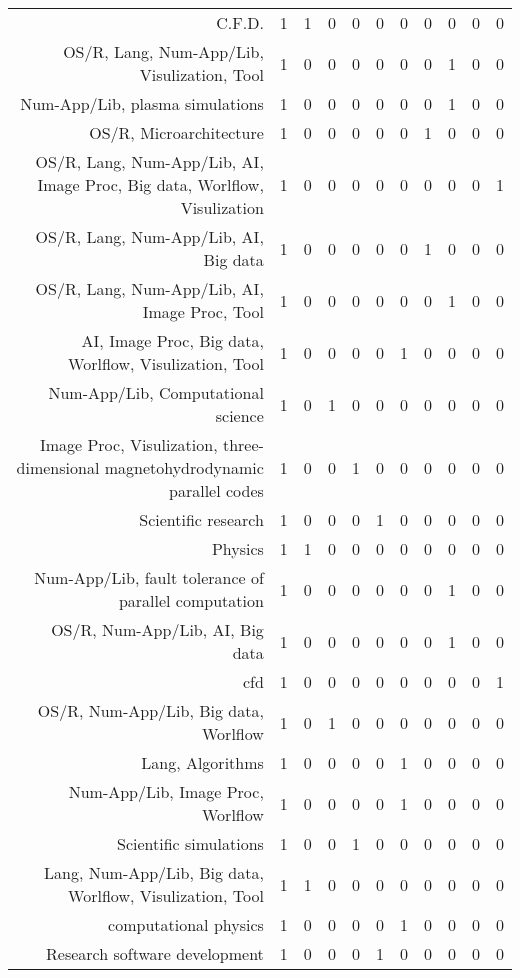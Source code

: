 {\begin{landscape}
\begin{longtable}[htb]{r|c|c|c|c|c|c|c|c|c|c}
{C.F.D.} & 1 & 1 & 0 & 0 & 0 & 0 & 0 & 0 & 0 & 0 \\%
{OS/R, Lang, Num-App/Lib, Visulization, Tool} & 1 & 0 & 0 & 0 & 0 & 0 & 0 & 1 & 0 & 0 \\%
{Num-App/Lib, plasma simulations} & 1 & 0 & 0 & 0 & 0 & 0 & 0 & 1 & 0 & 0 \\%
{OS/R, Microarchitecture} & 1 & 0 & 0 & 0 & 0 & 0 & 1 & 0 & 0 & 0 \\%
{OS/R, Lang, Num-App/Lib, AI, Image Proc, Big data, Worlflow, Visulization} & 1 & 0 & 0 & 0 & 0 & 0 & 0 & 0 & 0 & 1 \\%
{OS/R, Lang, Num-App/Lib, AI, Big data} & 1 & 0 & 0 & 0 & 0 & 0 & 1 & 0 & 0 & 0 \\%
{OS/R, Lang, Num-App/Lib, AI, Image Proc, Tool} & 1 & 0 & 0 & 0 & 0 & 0 & 0 & 1 & 0 & 0 \\%
{AI, Image Proc, Big data, Worlflow, Visulization, Tool} & 1 & 0 & 0 & 0 & 0 & 1 & 0 & 0 & 0 & 0 \\%
{Num-App/Lib, Computational science} & 1 & 0 & 1 & 0 & 0 & 0 & 0 & 0 & 0 & 0 \\%
{Image Proc, Visulization, three-dimensional magnetohydrodynamic parallel codes} & 1 & 0 & 0 & 1 & 0 & 0 & 0 & 0 & 0 & 0 \\%
{Scientific research} & 1 & 0 & 0 & 0 & 1 & 0 & 0 & 0 & 0 & 0 \\%
{Physics} & 1 & 1 & 0 & 0 & 0 & 0 & 0 & 0 & 0 & 0 \\%
{Num-App/Lib, fault tolerance of parallel computation} & 1 & 0 & 0 & 0 & 0 & 0 & 0 & 1 & 0 & 0 \\%
{OS/R, Num-App/Lib, AI, Big data} & 1 & 0 & 0 & 0 & 0 & 0 & 0 & 1 & 0 & 0 \\%
{cfd} & 1 & 0 & 0 & 0 & 0 & 0 & 0 & 0 & 0 & 1 \\%
{OS/R, Num-App/Lib, Big data, Worlflow} & 1 & 0 & 1 & 0 & 0 & 0 & 0 & 0 & 0 & 0 \\%
{Lang, Algorithms} & 1 & 0 & 0 & 0 & 0 & 1 & 0 & 0 & 0 & 0 \\%
{Num-App/Lib, Image Proc, Worlflow} & 1 & 0 & 0 & 0 & 0 & 1 & 0 & 0 & 0 & 0 \\%
{Scientific simulations} & 1 & 0 & 0 & 1 & 0 & 0 & 0 & 0 & 0 & 0 \\%
{Lang, Num-App/Lib, Big data, Worlflow, Visulization, Tool} & 1 & 1 & 0 & 0 & 0 & 0 & 0 & 0 & 0 & 0 \\%
{computational physics} & 1 & 0 & 0 & 0 & 0 & 1 & 0 & 0 & 0 & 0 \\%
{Research software development} & 1 & 0 & 0 & 0 & 1 & 0 & 0 & 0 & 0 & 0 \\%

\end{longtable}
\end{landscape}}

